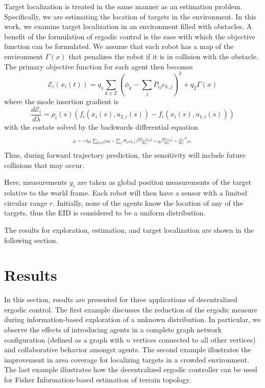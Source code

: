 \documentclass[letterpaper, 10 pt,  conference, twoside]{IEEEtran/IEEEtran}
\theoremstyle{definition}
\begin{document}
Target localization is treated in the same manner as an estimation problem. Specifically, we are estimating the location of targets in the environment. In this work, we examine target localization in an environment filled with obstacles. A benefit of the formulation of ergodic control is the ease with which the objective function can be formulated. We assume that each robot has a map of the environment $\Gamma(x)$ that penalizes the robot if it is in collision with the obstacle. The primary objective function for each agent then becomes
\begin{equation}
\mathcal{E}_i(x_i(t)) = q_1\sum_{k \in \mathbb{Z}} (\phi_k - \sum_j P_{ij} c_{k,j})^2 + q_2\Gamma(x)
 \end{equation}
where the mode insertion gradient is
\begin{equation*}
\frac{d \mathcal{E}_i}{d \lambda} = \rho_i(s) (f_i(x_i(s), u_{2,i}(s)) - f_i(x_i(s), u_{1,i}(s)))
\end{equation*}
with the costate solved by the backwards differential equation
\begin{equation*}
\resizebox{0.5 \textwidth}{!}
{ $
\dot{\rho}_i = - 2 q_1\sum_{k \in \mathcal{Z}}(\phi_k - \sum_j P _{ij} c_{k,j}) \frac{\partial F_{k,i}(x_i)}{\partial x_i} - q_2\frac{\partial \Gamma(x_i)}{\partial x_i}- \frac{\partial f_i}{\partial x_i }^T \rho_i .
$
}
\end{equation*}
Thus, during forward trajectory prediction, the sensitivity will include future collisions that may occur.

Here, measurements $y_i$ are taken as global position measurements of the target relative to the world frame. Each robot will then have a sensor with a limited circular range $r$. Initially, none of the agents know the location of any of the targets, thus the EID is considered to be a uniform distribution.

The results for exploration, estimation, and target localization are shown in the following section.

\section{Results} \label{sec:res}

In this section, results are presented for three applications of decentralized ergodic control. The first example discusses the reduction of the ergodic measure during information-based exploration of a unknown distribution. In particular, we observe the effects of introducing agents in a complete graph network configuration (defined as a graph with $n$ vertices connected to all other vertices) and collaborative behavior amongst agents. The second example illustrates the improvement in area coverage for localizing targets in a crowded environment. The last example illustrates how the decentralized ergodic controller can be used for Fisher Information-based estimation of terrain topology.
\end{document}
